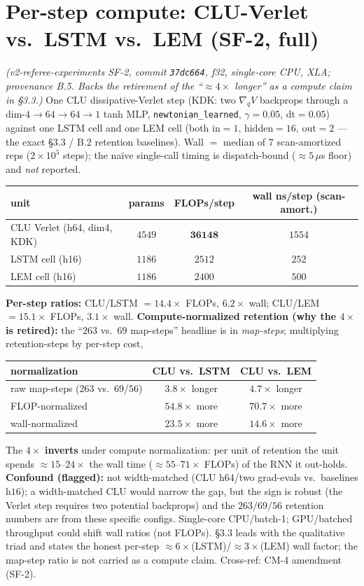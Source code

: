 \documentclass[10pt]{article}
\begin{document}
\section{Per-step compute: CLU-Verlet vs.\ LSTM vs.\ LEM (SF-2, full)}\label{app:compute}
\emph{(v2-referee-experiments SF-2, commit \texttt{37dc664}, f32, single-core CPU, XLA; provenance B.5. Backs the retirement of the ``$\approx4\times$ longer'' as a compute claim in \S3.3.)} One CLU dissipative-Verlet step (KDK: two $\nabla_qV$ backprops through a dim-$4{\to}64{\to}64{\to}1$ tanh MLP, \texttt{newtonian\_learned}, $\gamma{=}0.05$, $\mathrm{dt}{=}0.05$) against one LSTM cell and one LEM cell (both in$=1$, hidden$=16$, out$=2$ --- the exact \S3.3 / B.2 retention baselines). Wall $=$ median of $7$ scan-amortized reps ($2{\times}10^5$ steps); the naïve single-call timing is dispatch-bound ($\approx5\,\mu$s floor) and \emph{not} reported.
\begin{center}\small
\begin{tabular}{lccc}
\toprule
unit & params & FLOPs/step & wall ns/step (scan-amort.) \\
\midrule
CLU Verlet (h64, dim4, KDK) & $4549$ & $\mathbf{36148}$ & $1554$ \\
LSTM cell (h16) & $1186$ & $2512$ & $252$ \\
LEM cell (h16) & $1186$ & $2400$ & $500$ \\
\bottomrule
\end{tabular}
\end{center}
\textbf{Per-step ratios:} CLU/LSTM $=14.4\times$ FLOPs, $6.2\times$ wall; CLU/LEM $=15.1\times$ FLOPs, $3.1\times$ wall. \textbf{Compute-normalized retention (why the $4\times$ is retired):} the ``$263$ vs.\ $69$ map-steps'' headline is in \emph{map-steps}; multiplying retention-steps by per-step cost,
\begin{center}\small
\begin{tabular}{lcc}
\toprule
normalization & CLU vs.\ LSTM & CLU vs.\ LEM \\
\midrule
raw map-steps ($263$ vs.\ $69$/$56$) & $3.8\times$ longer & $4.7\times$ longer \\
FLOP-normalized & $\mathbf{54.8\times}$ more & $\mathbf{70.7\times}$ more \\
wall-normalized & $\mathbf{23.5\times}$ more & $\mathbf{14.6\times}$ more \\
\bottomrule
\end{tabular}
\end{center}
The $4\times$ \textbf{inverts} under compute normalization: per unit of retention the unit spends $\approx15$--$24\times$ the wall time ($\approx55$--$71\times$ FLOPs) of the RNN it out-holds. \textbf{Confound (flagged):} not width-matched (CLU h$64$/two grad-evals vs.\ baselines h$16$); a width-matched CLU would narrow the gap, but the sign is robust (the Verlet step requires two potential backprops) and the $263/69/56$ retention numbers are from these specific configs. Single-core CPU/batch-1; GPU/batched throughput could shift wall ratios (not FLOPs). \S3.3 leads with the qualitative triad and states the honest per-step $\approx6\times$(LSTM)/$\approx3\times$(LEM) wall factor; the map-step ratio is not carried as a compute claim. Cross-ref: CM-4 amendment (SF-2).
\end{document}
